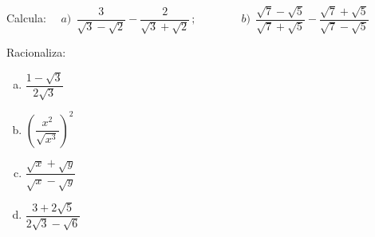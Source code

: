 \vspace{-8mm}
\begin{flushright}
\begin{footnotesize} \textcolor{gris}{}	\end{footnotesize}
\end{flushright}

\begin{mipropuesto}
	
	Calcula: $\quad a)\ \ \dfrac{3}{\sqrt{3}-\sqrt{2}} - \dfrac{2}{\sqrt{3}+\sqrt{2}}\, ; \qquad\qquad b) \ \ \dfrac{\sqrt{7}-\sqrt{5}}{\sqrt{7}+\sqrt{5}}-\dfrac{\sqrt{7}+\sqrt{5}}{\sqrt{7}-\sqrt{5}}$

\end{mipropuesto}

\vspace{-8mm}
\begin{flushright}
\begin{footnotesize} \textcolor{gris}{}	\end{footnotesize}
\end{flushright}


\begin{mipropuesto}
	
	Racionaliza:
	
	\begin{multicols}{2}
	\begin{enumerate}[a) ]
	\item 	$\dfrac{1-\sqrt{3}}{2\sqrt{3}}$
	\item $\left( \dfrac{x^2}{\sqrt{x^3}} \right)^2$
	\item $\dfrac{\sqrt{x}+\sqrt{y}}{\sqrt{x}-\sqrt{y}}$
	\item $\dfrac{3+2\sqrt{5}}{2\sqrt{3}-\sqrt{6}}$
	\end{enumerate}
	\end{multicols}
	\vspace{1mm}
\end{mipropuesto}

\vspace{-8mm}
\begin{flushright}
\begin{footnotesize} \textcolor{gris}{}	\end{footnotesize}
\end{flushright}

